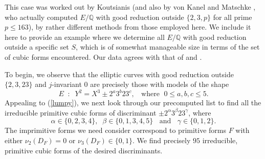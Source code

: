 This case was worked out by Koutsianis \cite{Kou} (and also by von Kanel and Matschke \cite{KanMat}, who actually computed $E/\mathbb{Q}$ with good reduction outside $\{ 2, 3, p \}$ for all prime $p \leq 163$), by rather different methods from those employed here. We include it here to provide an example where we determine all $E/\mathbb{Q}$ with good reduction outside a specific set $S$, which is of somewhat manageable size in terms of the set of cubic forms encountered. Our data agrees with that  of \cite{KanMat} and \cite{Kou}.

To begin, we observe that the elliptic curves with good reduction outside $\{ 2, 3, 23 \}$ and $j$-invariant $0$ are precisely those with models of the shape
$$
E \; \; : \; \; Y^2 = X^3 \pm 2^a 3^b 23^c, \; \; \mbox{ where } \; 0 \leq a, b, c \leq 5.
$$
Appealing to (\ref{lumpy}), we next  look through our precomputed list to find  all the irreducible primitive cubic forms of discriminant $\pm 2^{\alpha} 3^\beta 23^\gamma$,
where 
$$
\alpha \in \{ 0, 2, 3, 4 \}, \; \; \beta \in \{ 0, 1, 3, 4, 5 \} \; \; \mbox{ and } \; \; \gamma \in \{ 0, 1, 2 \}. 
$$
The imprimitive forms we need consider correspond to primitive
forms $F$ with either $\nu_2 (D_F) = 0$ or $\nu_3 (D_F) \in \{ 0, 1 \}$. We find precisely $95$ irreducible, primitive cubic forms of the desired discriminants.
\newpage
